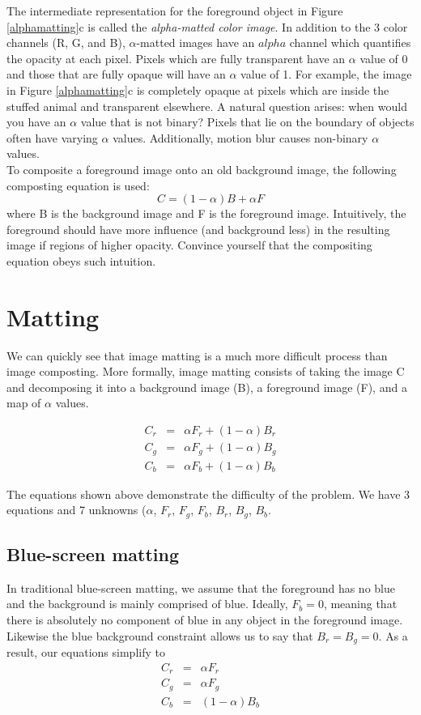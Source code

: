 \documentclass{article}
\begin{document}
The intermediate representation for the foreground object in Figure \ref{alphamatting}c is called the \textit{alpha-matted color image}. In addition to the 3 color channels (R, G, and B), $\alpha$-matted images have an $alpha$ channel which quantifies the opacity at each pixel. Pixels which are fully transparent have an $\alpha$ value of 0 and those that are fully opaque will have an $\alpha$ value of 1. For example, the image in Figure \ref{alphamatting}c is completely opaque at pixels which are inside the stuffed animal and transparent elsewhere. A natural question arises: when would you have an $\alpha$ value that is not binary? Pixels that lie on the boundary of objects often have varying $\alpha$ values. Additionally, motion blur causes non-binary $\alpha$ values. \\
To composite a foreground image onto an old background image, the following composting equation is used:
\begin{equation*}
    C = (1-\alpha) B + \alpha F
\end{equation*}
where B is the background image and F is the foreground image. Intuitively, the foreground should have more influence (and background less) in the resulting image if regions of higher opacity. Convince yourself that the compositing equation obeys such intuition.  \\


\section{Matting}
We can quickly see that image matting is a much more difficult process than image composting. More formally, image matting consists of taking the image C and decomposing it into a background image (B), a foreground image (F), and a map of $\alpha$ values. 

\begin{eqnarray*}
C_r &=& \alpha F_r  + (1-\alpha) B_r \\
C_g &=& \alpha F_g  + (1-\alpha) B_g \\
C_b &=& \alpha F_b + (1-\alpha) B_b 
\end{eqnarray*}

The equations shown above demonstrate the difficulty of the problem. We have 3 equations and 7 unknowns ($\alpha$, $F_r$, $F_g$, $F_b$, $B_r$, $B_g$, $B_b$.

\subsection{Blue-screen matting}
In traditional blue-screen matting, we assume that the foreground has no blue and the background is mainly comprised of blue. Ideally, $F_b = 0$, meaning that there is absolutely no component of blue in any object in the foreground image. Likewise the blue background constraint allows us to say that $B_r = B_g = 0$. As a result, our equations simplify to 
\begin{eqnarray*}
C_r &=& \alpha F_r  \\
C_g &=& \alpha F_g  \\
C_b &=& (1-\alpha) B_b 
\end{eqnarray*}
\end{document}
